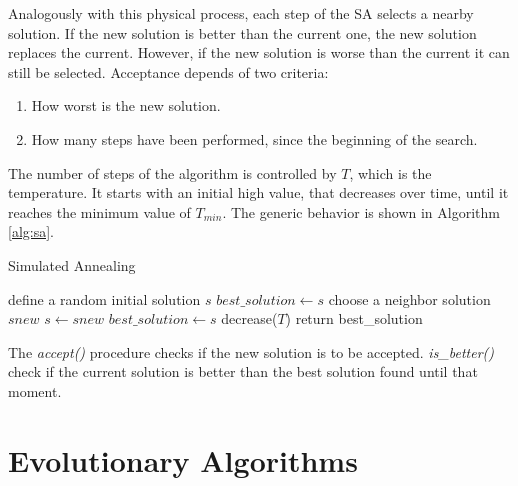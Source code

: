 			Analogously with this physical process, each step of the SA selects a nearby solution. If the new solution is better than the current one, the new solution replaces the current. However, if the new solution is worse than the current it can still be selected. Acceptance depends of two criteria:
			\begin{enumerate}
				\item How worst is the new solution.
				\item How many steps have been performed, since the beginning of the search.
			\end{enumerate}
			The number of steps of the algorithm is controlled by $T$, which is the temperature. It starts with an initial high value, that decreases over time, until it reaches the minimum value of $T_{min}$. The generic behavior is shown in Algorithm \ref{alg:sa}.
			
			
			\begin{algorithm}
				\caption{Simulated Annealing}
				\label{alg:sa}
				\begin{algorithmic}
				\STATE define a random initial solution $s$
				\STATE $best\_solution \gets s$ 
					\STATE choose a neighbor solution $snew$
						\STATE  $s \gets snew$
					\ENDIF
						\STATE  $best\_solution \gets s$
					\ENDIF
					\STATE decrease($T$)
				\ENDWHILE
				\STATE return best\_solution
				\end{algorithmic}
			\end{algorithm}
		
		
		\noindent The \emph{accept()} procedure checks if the new solution is to be accepted. \emph{is\_better()} check if the current solution is better than the best solution found until that moment.

			
		\section{Evolutionary Algorithms}
			\label{subsec:evolutionary_algorithms}
			
